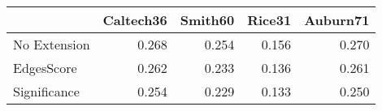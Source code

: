 \begin{tabular}{lrrrr}
\toprule
{} & Caltech36 & Smith60 & Rice31 & Auburn71 \\
\midrule
No Extension &     0.268 &   0.254 &  0.156 &    0.270 \\
EdgesScore   &     0.262 &   0.233 &  0.136 &    0.261 \\
Significance &     0.254 &   0.229 &  0.133 &    0.250 \\
\bottomrule
\end{tabular}
